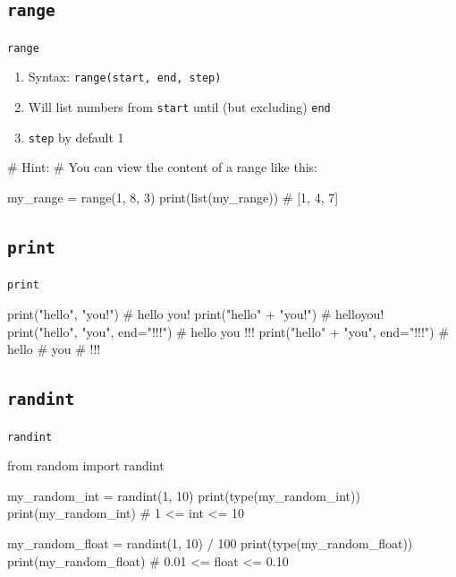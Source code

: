 \subsection{\texttt{range}}

\begin{frame}[fragile]{\texttt{range}}

    \begin{enumerate}
	\item Syntax: \texttt{range(start, end, step)}
	\item Will list numbers from \texttt{start} until (but excluding) \texttt{end}
	\item \texttt{step} by default 1
    \end{enumerate}

    \vspace{1em}

    \begin{pythoncode}
# Hint: 
# You can view the content of a range like this:

my_range = range(1, 8, 3)
print(list(my_range)) # [1, 4, 7]     
    \end{pythoncode}


\end{frame}

\subsection{\texttt{print}}

\begin{frame}[fragile]{\texttt{print}}

    \begin{pythoncode}

print("hello", "you!") # hello you!
print("hello" + "you!") # helloyou!
print("hello", "you", end="!!!\n") # hello you !!!
print("hello\n" + "you", end="\n!!!\n") 
# hello
# you
# !!!		

    \end{pythoncode}

\end{frame}

\subsection{\texttt{randint}}

\begin{frame}[fragile]{\texttt{randint}}

    \begin{pythoncode}
from random import randint

my_random_int = randint(1, 10)
print(type(my_random_int))
print(my_random_int) # 1 <= int <= 10

my_random_float = randint(1, 10) / 100
print(type(my_random_float)) 
print(my_random_float) # 0.01 <= float <= 0.10
    \end{pythoncode}

\end{frame}


